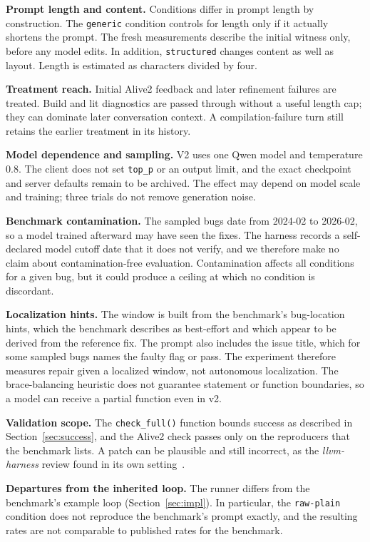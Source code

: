 \documentclass[conference]{IEEEtran}
\newcommand{\cn}[1]{\texttt{#1}}   %
\begin{document}
\textbf{Prompt length and content.} Conditions differ in prompt length by construction. The \cn{generic} condition controls for length only if it actually shortens the prompt. The fresh measurements describe the initial witness only, before any model edits. In addition, \cn{structured} changes content as well as layout. Length is estimated as characters divided by four.

\textbf{Treatment reach.} Initial Alive2 feedback and later refinement failures are treated. Build and lit diagnostics are passed through without a useful length cap; they can dominate later conversation context. A compilation-failure turn still retains the earlier treatment in its history.

\textbf{Model dependence and sampling.} V2 uses one Qwen model and temperature 0.8. The client does not set \texttt{top\_p} or an output limit, and the exact checkpoint and server defaults remain to be archived. The effect may depend on model scale and training; three trials do not remove generation noise.

\textbf{Benchmark contamination.} The sampled bugs date from 2024-02 to 2026-02, so a model trained afterward may have seen the fixes. The harness records a self-declared model cutoff date that it does not verify, and we therefore make no claim about contamination-free evaluation. Contamination affects all conditions for a given bug, but it could produce a ceiling at which no condition is discordant.

\textbf{Localization hints.} The window is built from the benchmark's bug-location hints, which the benchmark describes as best-effort and which appear to be derived from the reference fix. The prompt also includes the issue title, which for some sampled bugs names the faulty flag or pass. The experiment therefore measures repair given a localized window, not autonomous localization. The brace-balancing heuristic does not guarantee statement or function boundaries, so a model can receive a partial function even in v2.

\textbf{Validation scope.} The \texttt{check\_full()} function bounds success as described in Section~\ref{sec:success}, and the Alive2 check passes only on the reproducers that the benchmark lists. A patch can be plausible and still incorrect, as the \emph{llvm-harness} review found in its own setting~\cite{zheng2026harness}.

\textbf{Departures from the inherited loop.} The runner differs from the benchmark's example loop (Section~\ref{sec:impl}). In particular, the \cn{raw-plain} condition does not reproduce the benchmark's prompt exactly, and the resulting rates are not comparable to published rates for the benchmark.
\end{document}
